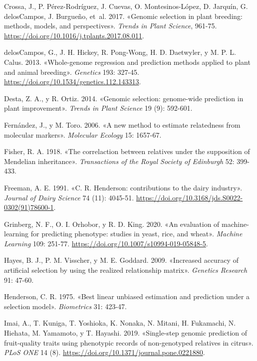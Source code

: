 \documentclass[11pt,spanish,a4paper,oneside,]{book} %
\begin{document}
\leavevmode\hypertarget{ref-cite:37}{}%
Crossa, J., P. Pérez-Rodríguez, J. Cuevas, O. Montesinos-López, D. Jarquín, G. delosCampos, J. Burgueño, et~al. 2017. «Genomic selection in plant breeding: methods, models, and perspectives». \emph{Trends in Plant Science}, 961-75. \url{https://doi.org/10.1016/j.tplants.2017.08.011}.

\leavevmode\hypertarget{ref-cite:31}{}%
delosCampos, G., J. H. Hickey, R. Pong-Wong, H. D. Daetwyler, y M. P. L. Calus. 2013. «Whole-genome regression and prediction methods applied to plant and animal breeding». \emph{Genetics} 193: 327-45. \url{https://doi.org/10.1534/genetics.112.143313}.

\leavevmode\hypertarget{ref-cite:10}{}%
Desta, Z. A., y R. Ortiz. 2014. «Genomic selection: genome-wide prediction in plant improvement». \emph{Trends in Plant Science} 19 (9): 592-601.

\leavevmode\hypertarget{ref-cite:24}{}%
Fernández, J., y M. Toro. 2006. «A new method to estimate relatedness from molecular markers». \emph{Molecular Ecology} 15: 1657-67.

\leavevmode\hypertarget{ref-cite:1}{}%
Fisher, R. A. 1918. «The correlaction between relatives under the supposition of Mendelian inheritance». \emph{Transactions of the Royal Society of Edinburgh} 52: 399-433.

\leavevmode\hypertarget{ref-cite:28}{}%
Freeman, A. E. 1991. «C. R. Henderson: contributions to the dairy industry». \emph{Journal of Dairy Science} 74 (11): 4045-51. \url{https://doi.org/10.3168/jds.S0022-0302(91)78600-1}.

\leavevmode\hypertarget{ref-cite:35}{}%
Grinberg, N. F., O. I. Orhobor, y R. D. King. 2020. «An evaluation of machine-learning for predicting phenotype: studies in yeast, rice, and wheat». \emph{Machine Learning} 109: 251-77. \url{https://doi.org/10.1007/s10994-019-05848-5}.

\leavevmode\hypertarget{ref-cite:13}{}%
Hayes, B. J., P. M. Visscher, y M. E. Goddard. 2009. «Increased accuracy of artificial selection by using the realized relationship matrix». \emph{Genetics Research} 91: 47-60.

\leavevmode\hypertarget{ref-cite:41}{}%
Henderson, C. R. 1975. «Best linear unbiased estimation and prediction under a selection model». \emph{Biometrics} 31: 423-47.

\leavevmode\hypertarget{ref-cite:20}{}%
Imai, A., T. Kuniga, T. Yoshioka, K. Nonaka, N. Mitani, H. Fukamachi, N. Hiehata, M. Yamamoto, y T. Hayashi. 2019. «Single-step genomic prediction of fruit-quality traits using phenotypic records of non-genotyped relatives in citrus». \emph{PLoS ONE} 14 (8). \url{https://doi.org/10.1371/journal.pone.0221880}.
\end{document}
